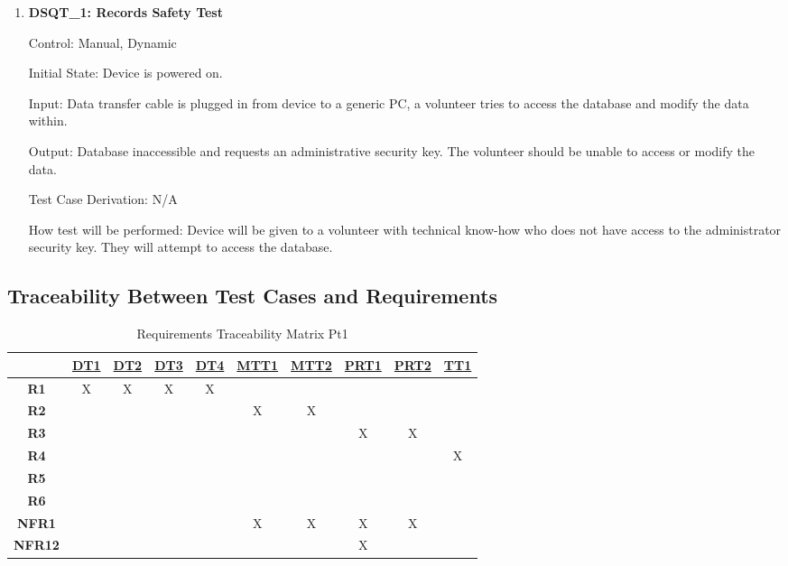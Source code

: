\documentclass[12pt, titlepage]{article}
\begin{document}
\begin{enumerate}

\item{\textbf{DSQT\_1: Records Safety Test}}\label{DSQT1}

Control: Manual, Dynamic

Initial State: Device is powered on.

Input: Data transfer cable is plugged in from device to a generic PC, a volunteer tries to access the database and modify the data within.

Output: Database inaccessible and requests an administrative security key. The volunteer should be unable to access or modify the data.

Test Case Derivation: N/A

How test will be performed: Device will be given to a volunteer with technical know-how who does not have access to the administrator security key. They will attempt to access the database. 


\end{enumerate}



\subsection{Traceability Between Test Cases and Requirements}


\noindent
\begin{table}[H]
	\centering
	\begin{tabular}{|c|c|c|c|c|c|c|c|c|c|}
	\hline
		& \hyperref[DT1]{DT1}& \hyperref[DT2]{DT2}&\hyperref[DT3]{DT3}& \hyperref[DT4]{DT4} &\hyperref[MTT1]{MTT1}&\hyperref[MTT2]{MTT2}&\hyperref[PRT1]{PRT1}&\hyperref[PRT2]{PRT2}&\hyperref[TT1]{TT1} \\
	\hline       
	\textbf{R1}         &X&X&X&X&&&&& \\ \hline
	\textbf{R2}         &&&&&X&X&&&\\ \hline
	\textbf{R3}         &&&&&&&X&X& \\ \hline
	\textbf{R4}         &&&&&&&&&X\\ \hline
	\textbf{R5}         &&&&&&&&& \\ \hline
	\textbf{R6}         &&&&&&&&&\\ \hline
	\textbf{NFR1}     &&&&&X&X&X&X& \\ \hline
	\textbf{NFR12}   &&&&&&&X&&\\ \hline
	\hline
	\end{tabular}
	\caption{ Requirements Traceability Matrix Pt1}
	\label{Table:A_trace}
\end{table}
\end{document}
